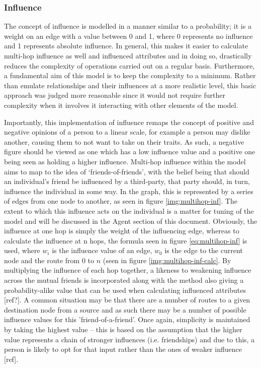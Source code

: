 \documentclass[]{report}
\begin{document}
\subsubsection{Influence}
The concept of influence is modelled in a manner similar to a probability; it is a weight on an edge with a value between 0 and 1, where 0 represents no influence and 1 represents absolute influence. In general, this makes it easier to calculate multi-hop influence as well and influenced attributes and in doing so, drastically reduces the complexity of operations carried out on a regular basis. Furthermore, a fundamental aim of this model is to keep the complexity to a minimum. Rather than emulate relationships and their influences at a more realistic level, this basic approach was judged more reasonable since it would not require further complexity when it involves it interacting with other elements of the model. 

Importantly, this implementation of influence remaps the concept of positive and negative opinions of a person to a linear scale, for example a person may dislike another, causing them to not want to take on their traits. As such, a negative figure should be viewed as one which has a low influence value and a positive one being seen as holding a higher influence.
Multi-hop influence within the model aims to map to the idea of `friends-of-friends', with the belief being that should an individual's friend be influenced by a third-party, that party should, in turn, influence the individual in some way. In the graph, this is represented by a series of edges from one node to another, as seen in figure \ref{img:multihop-inf}. The extent to which this influence acts on the individual is a matter for tuning of the model and will be discussed in the Agent section of this document. Obviously, the influence at one hop is simply the weight of the influencing edge, whereas to calculate the influence at n hops, the formula seen in figure \ref{eq:multihop-inf} is used, where $w_{i}$ is the influence value of an edge, $w_{0}$ is the edge to the current node and the route from $0$ to $n$ (seen in figure \ref{img:multihop-inf-calc}. By multiplying the influence of each hop together, a likeness to weakening influence across the mutual friends is incorporated along with the method also giving a probability-alike value that can be used when calculating influenced attributes [ref?]. A common situation may be that there are a number of routes to a given destination node from a source and as such there may be a number of possible influence values for this 'friend-of-a-friend'. Once again, simplicity is maintained by taking the highest value – this is based on the assumption that the higher value represents a chain of stronger influences (i.e. friendships) and due to this, a person is likely to opt for that input rather than the ones of weaker influence [ref].
\end{document}

